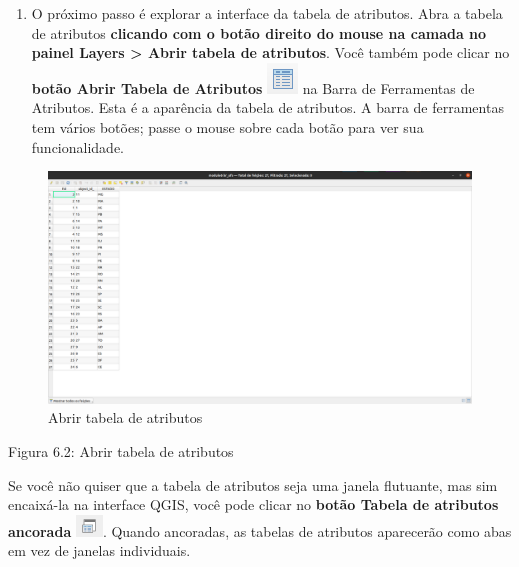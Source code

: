 \documentclass[
  portuguese,
]{krantz}
\providecommand{\tightlist}{%
  \setlength{\itemsep}{0pt}\setlength{\parskip}{0pt}}
\begin{document}
\begin{enumerate}
\def\labelenumi{\arabic{enumi}.}
\setcounter{enumi}{1}
\tightlist
\item
  O próximo passo é explorar a interface da tabela de atributos. Abra a tabela de atributos \textbf{clicando com o botão direito do mouse na camada no painel Layers \textgreater{} Abrir tabela de atributos}. Você também pode clicar no \textbf{botão Abrir Tabela de Atributos} \includegraphics{media/modulo6/open-attribute-btn.png} na Barra de Ferramentas de Atributos. Esta é a aparência da tabela de atributos. A barra de ferramentas tem vários botões; passe o mouse sobre cada botão para ver sua funcionalidade.
\end{enumerate}

\begin{figure}
\centering
\includegraphics{media/modulo6/attribute-tab.png}
\caption{Abrir tabela de atributos}
\end{figure}

Figura 6.2: Abrir tabela de atributos

Se você não quiser que a tabela de atributos seja uma janela flutuante, mas sim encaixá-la na interface QGIS, você pode clicar no \textbf{botão Tabela de atributos ancorada} \includegraphics{media/modulo6/dock-attr-btn.png}. Quando ancoradas, as tabelas de atributos aparecerão como abas em vez de janelas individuais.
\end{document}
